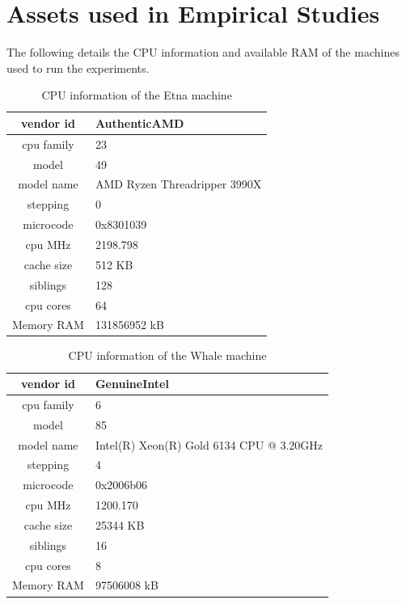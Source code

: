 \documentclass[
10pt, %
a4paper, %
oneside, %
headinclude,footinclude, %
BCOR5mm, %
]{scrartcl}
\begin{document}
\section{Assets used in Empirical Studies}\label{sec:cpu_section}

The following details the CPU information and available RAM of the machines used to run the experiments.

\begin{table}[!ht]
\centering
\begin{tabular}{|c|p{7cm}|}
\hline
vendor id       & AuthenticAMD \\\hline
cpu family      & 23 \\\hline
model           & 49 \\\hline
model name      & AMD Ryzen Threadripper 3990X\\\hline
stepping        & 0 \\\hline
microcode       & 0x8301039 \\\hline
cpu MHz         & 2198.798 \\\hline
cache size      & 512 KB \\\hline
siblings        & 128 \\\hline
cpu cores       & 64 \\\hline\hline
Memory RAM      & 131856952 kB\\\hline
\end{tabular}
\caption{CPU information of the Etna machine}\label{cpu:etna}
\end{table}

\begin{table}[!ht]
\centering
\begin{tabular}{|c|p{7cm}|}
\hline
vendor id       & GenuineIntel \\\hline
cpu family      & 6 \\\hline
model           & 85 \\\hline
model name      & Intel(R) Xeon(R) Gold 6134 CPU @ 3.20GHz \\\hline
stepping        & 4 \\\hline
microcode       & 0x2006b06 \\\hline
cpu MHz         & 1200.170 \\\hline
cache size      & 25344 KB \\\hline
siblings        & 16 \\\hline
cpu cores       & 8 \\\hline\hline
Memory RAM      & 97506008 kB\\\hline
\end{tabular}
\caption{CPU information of the Whale machine}\label{cpu:whale}
\end{table}
\end{document}
